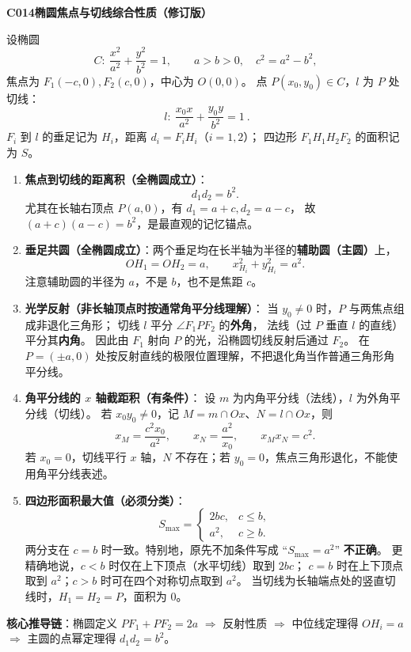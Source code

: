\begin{statementbox}
\textbf{C014\quad 椭圆焦点与切线综合性质（修订版）}

设椭圆
\[
C:\ \frac{x^2}{a^2}+\frac{y^2}{b^2}=1,
\qquad a>b>0,\quad c^2=a^2-b^2,
\]
焦点为 $F_1(-c,0),F_2(c,0)$，中心为 $O(0,0)$。
点 $P(x_0,y_0)\in C$，$l$ 为 $P$ 处切线：
\[
\boxed{\ l:\ \frac{x_0x}{a^2}+\frac{y_0y}{b^2}=1\ }.
\]
$F_i$ 到 $l$ 的垂足记为 $H_i$，距离 $d_i=F_iH_i$（$i=1,2$）；
四边形 $F_1H_1H_2F_2$ 的面积记为 $S$。

\begin{enumerate}
\item \textbf{焦点到切线的距离积（全椭圆成立）}：
\[
\boxed{d_1d_2=b^2}.
\]
尤其在长轴右顶点 $P(a,0)$，有 $d_1=a+c,d_2=a-c$，
故 $(a+c)(a-c)=b^2$，是最直观的记忆锚点。

\item \textbf{垂足共圆（全椭圆成立）}：两个垂足均在长半轴为半径的\textbf{辅助圆（主圆）}上，
\[
\boxed{OH_1=OH_2=a},\qquad
\boxed{x_{H_i}^2+y_{H_i}^2=a^2}.
\]
注意辅助圆的半径为 $a$，不是 $b$，也不是焦距 $c$。

\item \textbf{光学反射（非长轴顶点时按通常角平分线理解）}：
当 $y_0\ne0$ 时，$P$ 与两焦点组成非退化三角形；
切线 $l$ 平分 $\angle F_1PF_2$ 的\textbf{外角}，
法线（过 $P$ 垂直 $l$ 的直线）平分其\textbf{内角}。
因此由 $F_1$ 射向 $P$ 的光，沿椭圆切线反射后通过 $F_2$。
在 $P=(\pm a,0)$ 处按反射直线的极限位置理解，不把退化角当作普通三角形角平分线。

\item \textbf{角平分线的 $x$ 轴截距积（有条件）}：
设 $m$ 为内角平分线（法线），$l$ 为外角平分线（切线）。
若 $x_0y_0\ne0$，记 $M=m\cap Ox$、$N=l\cap Ox$，则
\[
\boxed{x_M=\frac{c^2x_0}{a^2}},\qquad
\boxed{x_N=\frac{a^2}{x_0}},\qquad
\boxed{x_Mx_N=c^2}.
\]
若 $x_0=0$，切线平行 $x$ 轴，$N$ 不存在；若 $y_0=0$，焦点三角形退化，不能使用角平分线表述。

\item \textbf{四边形面积最大值（必须分类）}：
\[
\boxed{
S_{\max}=\begin{cases}
2bc,&c\le b,\\
a^2,&c\ge b.
\end{cases}}
\]
两分支在 $c=b$ 时一致。特别地，原先不加条件写成
``$S_{\max}=a^2$'' \textbf{不正确}。
更精确地说，$c<b$ 时仅在上下顶点（水平切线）取到 $2bc$；
$c=b$ 时在上下顶点取到 $a^2$；$c>b$ 时可在四个对称切点取到 $a^2$。
当切线为长轴端点处的竖直切线时，$H_1=H_2=P$，面积为 $0$。
\end{enumerate}

\textbf{核心推导链}：椭圆定义 $PF_1+PF_2=2a$
$\Longrightarrow$ 反射性质
$\Longrightarrow$ 中位线定理得 $OH_i=a$
$\Longrightarrow$ 主圆的点幂定理得 $d_1d_2=b^2$。
\end{statementbox}
